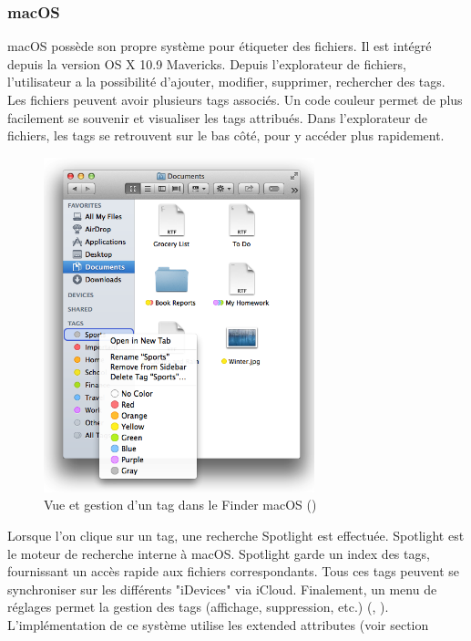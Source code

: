 \documentclass[a4paper, 12pt]{article}
\begin{document}
\subsubsection{macOS}
macOS possède son propre système pour étiqueter des fichiers. Il est intégré depuis la version 
OS X 10.9 Mavericks. Depuis l'explorateur de fichiers, l'utilisateur a la possibilité 
d'ajouter, modifier, supprimer, rechercher des tags. Les fichiers peuvent avoir plusieurs tags 
associés. Un code couleur permet de plus facilement se souvenir et visualiser les tags attribués. 
Dans l'explorateur de fichiers, les tags se retrouvent sur le bas côté, pour y accéder plus 
rapidement. 
\begin{figure}
    \begin{center}
        \includegraphics[width=0.7\textwidth]{images/macos_tags.png}
    \end{center}
    \caption{Vue et gestion d'un tag dans le Finder macOS (\cite{ref5})}
    \label{macos_tags}
\end{figure}
Lorsque l'on clique sur un tag, une recherche Spotlight est effectuée. Spotlight est le moteur de 
recherche interne à macOS. Spotlight garde un index des tags, fournissant un accès rapide aux 
fichiers correspondants.
Tous ces tags peuvent se synchroniser sur les différents "iDevices" via iCloud. Finalement, 
un menu de réglages permet la gestion des tags (affichage, suppression, etc.) (\cite{ref5}, 
\cite{ref6}). L'implémentation de ce système utilise les extended attributes (voir section 
\end{document}

